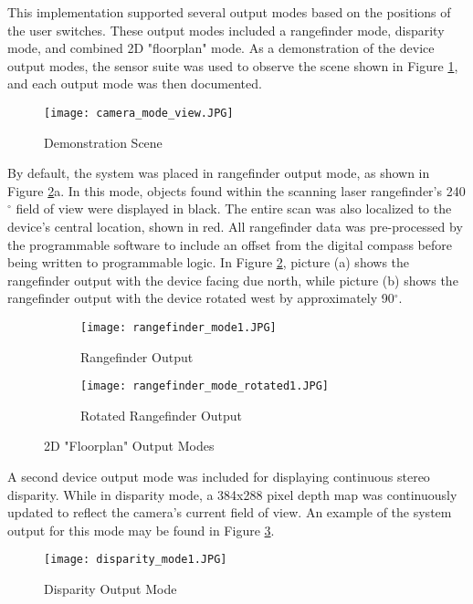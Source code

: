 \par
This implementation supported several output modes based on the positions of the user switches. These output modes included a rangefinder mode, disparity mode, and combined 2D "floorplan" mode. As a demonstration of the device output modes, the sensor suite was used to observe the scene shown in Figure \ref{demoScene}, and each output mode was then documented.
\par
\begin{figure}[H]
	\centerline{
	\texttt{[image: camera\_mode\_view.JPG]}
	}
	\caption{Demonstration Scene}
	\label{demoScene}
\end{figure}
\par
By default, the system was placed in rangefinder output mode, as shown in Figure \ref{rangeOutputs}a. In this mode, objects found within the scanning laser rangefinder's 240$^\circ$ field of view were displayed in black. The entire scan was also localized to the device's central location, shown in red. All rangefinder data was pre-processed by the programmable software to include an offset from the digital compass before being written to programmable logic. In Figure \ref{rangeOutputs}, picture (a) shows the rangefinder output with the device facing due north, while picture (b) shows the rangefinder output with the device rotated west by approximately 90$^\circ$.
\par
\begin{figure}[H]
\centering
       \begin{subfigure}[h]{1\textwidth}
            \centerline{\texttt{[image: rangefinder\_mode1.JPG]}}
           \caption{Rangefinder Output}
       \end{subfigure}
       \begin{subfigure}[h]{1\textwidth}
           \centerline{\texttt{[image: rangefinder\_mode\_rotated1.JPG]}}
           \caption{Rotated Rangefinder Output}
       \end{subfigure}
\caption{2D "Floorplan" Output Modes}
\label{rangeOutputs}
\end{figure}
\par
A second device output mode was included for displaying continuous stereo disparity. While in disparity mode, a 384x288 pixel depth map was continuously updated to reflect the camera's current field of view. An example of the system output for this mode may be found in Figure \ref{disparityOutputs}.
\begin{figure}[H]
        \centerline{\texttt{[image: disparity\_mode1.JPG]}}
        \caption{Disparity Output Mode}
        \label{disparityOutputs}
\end{figure}
